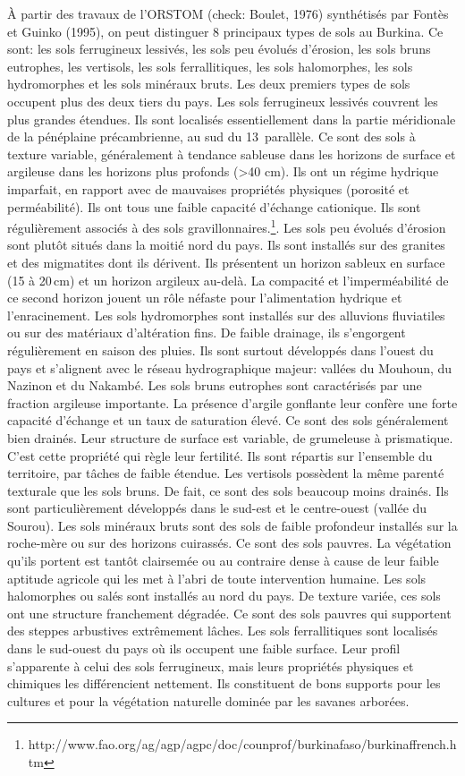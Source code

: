 \documentclass[a4paper,11pt]{article}
\begin{document}
À partir des travaux de l’ORSTOM (check: Boulet, 1976) synthétisés par Fontès
et Guinko (1995), on peut distinguer 8 principaux types de sols au
Burkina. Ce sont: les sols ferrugineux lessivés, les sols peu évolués
d’érosion, les sols bruns eutrophes, les vertisols, les sols
ferrallitiques, les sols halomorphes, les sols hydromorphes et les
sols minéraux bruts. Les deux premiers types de sols occupent plus des
deux tiers du pays.  Les sols ferrugineux lessivés couvrent les plus
grandes étendues. Ils sont localisés essentiellement dans la partie
méridionale de la pénéplaine précambrienne, au sud du 13\ieme\,
parallèle. Ce sont des sols à texture variable, généralement à
tendance sableuse dans les horizons de surface et argileuse dans les
horizons plus profonds (>{}40 cm). Ils ont un régime hydrique imparfait,
en rapport avec de mauvaises propriétés physiques (porosité
et perméabilité). Ils ont tous une faible capacité d’échange
cationique. Ils sont régulièrement associés à des sols
gravillonnaires.\footnote{http://www.fao.org/ag/agp/agpc/doc/counprof/burkinafaso/burkinaffrench.htm}. Les sols peu évolués d’érosion sont plutôt situés dans la moitié nord du pays. Ils sont
installés sur des granites et des migmatites dont ils dérivent. Ils
présentent un horizon sableux en surface (15 à 20\,cm) et un horizon
argileux au-delà. La compacité et l’imperméabilité de ce second
horizon jouent un rôle néfaste pour l’alimentation hydrique et
l’enracinement.  Les sols hydromorphes sont installés sur des
alluvions fluviatiles ou sur des matériaux d’altération fins. De
faible drainage, ils s’engorgent régulièrement en saison des
pluies. Ils sont surtout développés dans l’ouest du pays et s’alignent
avec le réseau hydrographique majeur: vallées du Mouhoun, du Nazinon
et du Nakambé.  Les sols bruns eutrophes sont caractérisés par une
fraction argileuse importante. La présence d’argile gonflante leur
confère une forte capacité d’échange et un taux de saturation
élevé. Ce sont des sols généralement bien drainés. Leur structure de
surface est variable, de grumeleuse à prismatique. C’est cette
propriété qui règle leur fertilité. Ils sont répartis sur l’ensemble
du territoire, par tâches de faible étendue.  Les vertisols possèdent
la même parenté texturale que les sols bruns.  De fait, ce sont des sols beaucoup
moins drainés. Ils sont particulièrement développés dans le sud-est et
le centre-ouest (vallée du Sourou).  Les sols minéraux bruts sont des
sols de faible profondeur installés sur la roche-mère ou sur des
horizons cuirassés. Ce sont des sols pauvres. La végétation qu’ils
portent est tantôt clairsemée ou au contraire dense à cause de leur
faible aptitude agricole qui les met à l’abri de toute intervention
humaine.  Les sols halomorphes ou salés sont installés au nord du
pays. De texture variée, ces sols ont une structure franchement
dégradée. Ce sont des sols pauvres qui supportent des steppes
arbustives extrêmement lâches.  Les sols ferrallitiques sont localisés
dans le sud-ouest du pays où ils occupent une faible surface. Leur
profil s’apparente à celui des sols ferrugineux, mais leurs propriétés
physiques et chimiques les différencient nettement. Ils constituent de
bons supports pour les cultures et pour la végétation naturelle
dominée par les savanes arborées.
\end{document}
